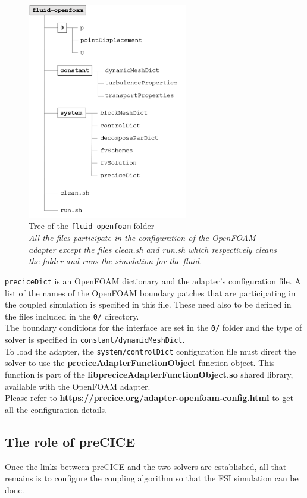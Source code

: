 \documentclass[oneside,11pt,times]{book}
\begin{document}
\begin{figure}[H]
    \centering
    \includegraphics[width=7cm]{imgs/Illustrations/arborescence.png}
    \caption{Tree of the \texttt{fluid-openfoam} folder\\ \emph{All the files participate in the configuration of the OpenFOAM adapter except the files clean.sh and run.sh which respectively cleans the folder and runs the simulation for the fluid.}}
    \label{arborescence}
\end{figure}

\texttt{preciceDict} is an OpenFOAM dictionary and the adapter’s configuration file. A list of the names of the OpenFOAM boundary patches that are participating in the coupled simulation is specified in this file. These need also to be defined in the files included in the \texttt{0/} directory.\\

The boundary conditions for the interface are set in the \texttt{0/} folder and the type of solver is specified in \texttt{constant/dynamicMeshDict}.\\

To load the adapter, the \texttt{system/controlDict} configuration file must direct the solver to use the \textbf{preciceAdapterFunctionObject} function object. This function is part of the \textbf{libpreciceAdapterFunctionObject.so} shared library, available with the OpenFOAM adapter.\\

Please refer to \textbf{https://precice.org/adapter-openfoam-config.html} to get all the configuration details.

\subsection{The role of preCICE}
Once the links between preCICE and the two solvers are established, all that remains is to configure the coupling algorithm so that the FSI simulation can be done.
\end{document}
